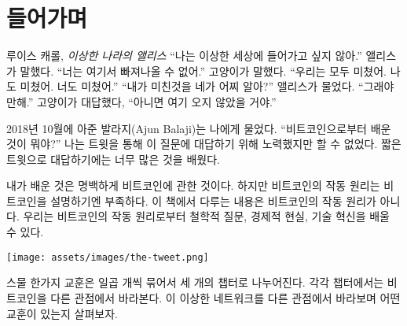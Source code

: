 \chapter*{들어가며}
\label{ch:introduction}

\begin{chapquote}{루이스 캐롤, \textit{이상한 나라의 앨리스}}
\enquote{나는 이상한 세상에 들어가고 싶지 않아.}  앨리스가 말했다. 
\enquote{너는 여기서 빠져나올 수 없어.}  고양이가 말했다. 
\enquote{우리는 모두 미쳤어. 나도 미쳤어. 너도 미쳤어.} 
\enquote{내가 미친것을 네가 어찌 알아?}  앨리스가 물었다. 
\enquote{그래야만해.} 고양이가 대답했다, 
\enquote{아니면 여기 오지 않았을 거야.}
\end{chapquote}

2018년 10월에 아준 발라지(Ajun Balaji)는 나에게 물었다.
\enquote{비트코인으로부터 배운 것이 뭐야?} 나는 트윗을 통해 이 질문에 대답하기 위해 노력했지만 할 수 없었다.
짧은 트윗으로 대답하기에는 너무 많은 것을 배웠다.

내가 배운 것은 명백하게 비트코인에 관한 것이다. 하지만 비트코인의 작동 원리는 비트코인을 설명하기엔 부족하다.
이 책에서 다루는 내용은 비트코인의 작동 원리가 아니다. 우리는 비트코인의 작동 원리로부터 철학적
질문, 경제적 현실, 기술 혁신을 배울 수 있다.


\begin{center}
  \texttt{[image: assets/images/the-tweet.png]}
\end{center}

스물 한가지 교훈은 일곱 개씩 묶어서 세 개의 챕터로 나누어진다. 각각 챕터에서는 비트코인을 다른 관점에서
바라본다. 이 이상한 네트워크를 다른 관점에서 바라보며 어떤 교훈이 있는지 살펴보자.

